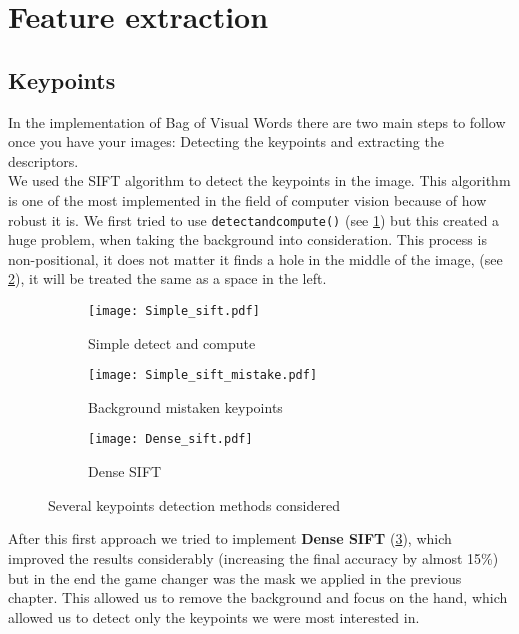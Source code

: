 \documentclass[9pt,a4paper,twoside]{tau-class/tau}
\begin{document}
\section{Feature extraction} \label{sec:table}
    \subsection{Keypoints}
    In the implementation of Bag of Visual Words there are two main steps to follow once you have your images: 
    Detecting the keypoints and extracting the descriptors.\\
    
    We used the SIFT algorithm to detect the keypoints
    in the image. This algorithm is one of the most implemented in the field of computer vision because of how 
    robust it is. We first tried to use \verb|detectandcompute()| (see \ref{fig:figa}) but this created a huge problem,
    when taking the background into consideration. This process is non-positional, it does not matter 
    it finds a hole in the middle of the image, (see \ref{fig:figb}), it will be treated the same as a space in the left.\\

    \begin{figure*}[b] %
		\centering
		\begin{subfigure}[b]{0.2\linewidth} %
			\texttt{[image: Simple\_sift.pdf]} %
			\caption{Simple detect and compute}
			\label{fig:figa}
		\end{subfigure}
			\hspace{20pt}   %
		\begin{subfigure}[b]{0.2\linewidth} %
			\texttt{[image: Simple\_sift\_mistake.pdf]}
			\caption{Background mistaken keypoints}
			\label{fig:figb}
		\end{subfigure}
            \hspace{20pt} 
        \begin{subfigure}[b]{0.2\linewidth} %
            \texttt{[image: Dense\_sift.pdf]}
            \caption{Dense SIFT}
            \label{fig:figc}            
        \end{subfigure}
		\caption{Several keypoints detection methods considered}
		\label{fig:examplefloat}
	\end{figure*}
    After this first approach
    we tried to implement \textbf{Dense SIFT} (\ref{fig:figc}), which improved the results considerably (increasing the final accuracy by almost 15\%) but in the end 
    the game changer %
    was the mask we applied in the previous chapter. This allowed us to remove the background and focus 
    on the hand, which allowed us to detect only the keypoints we were most interested in.
\end{document}
